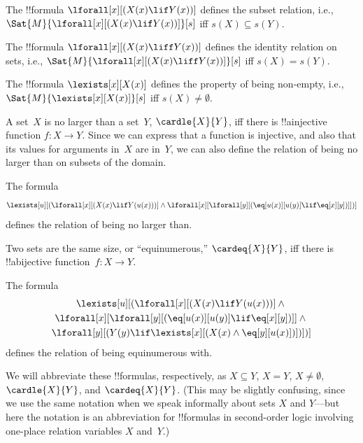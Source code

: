 \documentclass[../../../include/open-logic-section]{subfiles}
\begin{document}


\begin{prop}
The !!{formula} $\lforall[x][(X(x) \lif Y(x))]$ defines the subset
relation, i.e., $\Sat{M}{\lforall[x][(X(x) \lif Y(x))]}[s]$ iff $s(X)
\subseteq s(Y)$.
\end{prop}

\begin{prop}
The !!{formula} $\lforall[x][(X(x) \liff Y(x))]$ defines the identity
relation on sets, i.e., $\Sat{M}{\lforall[x][(X(x) \liff Y(x))]}[s]$
iff $s(X) = s(Y)$.
\end{prop}

\begin{prop}
The !!{formula} $\lexists[x][X(x)]$ defines the property of being
non-empty, i.e., $\Sat{M}{\lexists[x][X(x)]}[s]$ iff $s(X) \neq
\emptyset$.
\end{prop}

A set~$X$ is no larger than a set~$Y$, $\cardle{X}{Y}$, iff there is
!!a{injective} function $f\colon X \to Y$.  Since we can express that
a function is injective, and also that its values for arguments in~$X$
are in~$Y$, we can also define the relation of being no larger than on
subsets of the domain.

\begin{prop}
The formula
\[
\lexists[u][(\lforall[x][(X(x) \lif Y(u(x)))] \land \lforall[x][\lforall[y][(\eq[u(x)][u(y)] \lif
      \eq[x][y])]])]
\]
defines the relation of being no larger than.
\end{prop}

Two sets are the same size, or ``equinumerous,'' $\cardeq{X}{Y}$, iff
there is !!a{bijective} function~$f\colon X \to Y$.

\begin{prop}
The formula
\begin{multline*}
  \lexists[u][(\lforall[x][(X(x) \lif Y(u(x)))] \land {}\\
    \lforall[x][\lforall[y][(\eq[u(x)][u(y)] \lif \eq[x][y])]]
  \land {} \\\lforall[y][(Y(y) \lif \lexists[x][(X(x)
      \land \eq[y][u(x)])])])]
\end{multline*}
defines the relation of being equinumerous with.
\end{prop}

We will abbreviate these !!{formula}s, respectively, as $X \subseteq Y$,
$X = Y$, $X \neq \emptyset$, $\cardle{X}{Y}$, and
$\cardeq{X}{Y}$. (This may be slightly confusing, since we use the
same notation when we speak informally about sets $X$ and $Y$---but
here the notation is an abbreviation for !!{formula}s in second-order
logic involving one-place relation variables $X$ and~$Y$.)
\end{document}
